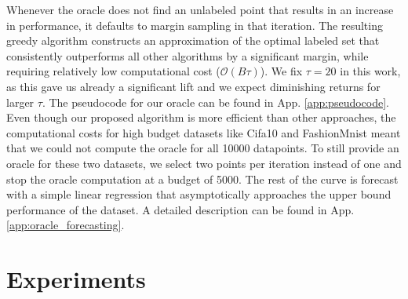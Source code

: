 \documentclass[]{article}
\newcommand{\LL}{\mathcal{L}}
\begin{document}
Whenever the oracle does not find an unlabeled point that results in an increase in performance, it defaults to margin sampling in that iteration.
The resulting greedy algorithm constructs an approximation of the optimal labeled set that consistently outperforms all other algorithms by a significant margin, while requiring relatively low computational cost ($\mathcal{O}(B\tau)$).
We fix $\tau = 20$ in this work, as this gave us already a significant lift and we expect diminishing returns for larger $\tau$.
The pseudocode for our oracle can be found in App. \ref{app:pseudocode}.
Even though our proposed algorithm is more efficient than other approaches, the computational costs for high budget datasets like Cifa10 and FashionMnist meant that we could not compute the oracle for all 10000 datapoints.
To still provide an oracle for these two datasets, we select two points per iteration instead of one and stop the oracle computation at a budget of 5000.
The rest of the curve is forecast with a simple linear regression that asymptotically approaches the upper bound performance of the dataset. 
A detailed description can be found in App. \ref{app:oracle_forecasting}.


\section{Experiments}
\end{document}
